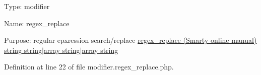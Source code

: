 \-Type\-: modifier\par
 \-Name\-: regex\-\_\-replace\par
 \-Purpose\-: regular epxression search/replace \hyperlink{}{regex\-\_\-replace (\-Smarty online manual)  string  string$|$array  string$|$array  string }

\-Definition at line 22 of file modifier.\-regex\-\_\-replace.\-php.


